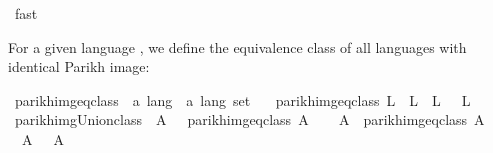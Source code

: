 \begin{isabellebody}
\ fast\isanewline
{}\isamarkupfalse%
%
\endisatagproof
{\isafoldproof}%
%
\isadelimproof
%
\endisadelimproof
%
\isadelimdocument
%
\endisadelimdocument
%
\isatagdocument
%
\isamarkuptrue%
%
\endisatagdocument
{\isafolddocument}%
%
\isadelimdocument
%
\endisadelimdocument
%
\begin{isamarkuptext}%
For a given language , we define the equivalence class of all languages with identical Parikh
image:%
\end{isamarkuptext}\isamarkuptrue%
\isamarkupfalse%
\ parikh{\isacharunderscore}{\kern0pt}img{\isacharunderscore}{\kern0pt}eq{\isacharunderscore}{\kern0pt}class\ {\isacharcolon}{\kern0pt}{\isacharcolon}{\kern0pt}\ {\isachardoublequoteopen}{\isacharprime}{\kern0pt}a\ lang\ {\isasymRightarrow}\ {\isacharprime}{\kern0pt}a\ lang\ set{\isachardoublequoteclose}\ \isanewline
\ \ {\isachardoublequoteopen}parikh{\isacharunderscore}{\kern0pt}img{\isacharunderscore}{\kern0pt}eq{\isacharunderscore}{\kern0pt}class\ L\ {\isasymequiv}\ {\isacharbraceleft}{\kern0pt}L{\isacharprime}{\kern0pt}{\isachardot}{\kern0pt}\ {\isasymPsi}\ L{\isacharprime}{\kern0pt}\ {\isacharequal}{\kern0pt}\ {\isasymPsi}\ L{\isacharbraceright}{\kern0pt}{\isachardoublequoteclose}\isanewline
\isanewline
{}\isamarkupfalse%
\ parikh{\isacharunderscore}{\kern0pt}img{\isacharunderscore}{\kern0pt}Union{\isacharunderscore}{\kern0pt}class{\isacharcolon}{\kern0pt}\ {\isachardoublequoteopen}{\isasymPsi}\ A\ {\isacharequal}{\kern0pt}\ {\isasymPsi}\ {\isacharparenleft}{\kern0pt}{\isasymUnion}{\isacharparenleft}{\kern0pt}parikh{\isacharunderscore}{\kern0pt}img{\isacharunderscore}{\kern0pt}eq{\isacharunderscore}{\kern0pt}class\ A{\isacharparenright}{\kern0pt}{\isacharparenright}{\kern0pt}{\isachardoublequoteclose}\isanewline
%
\isadelimproof
%
\endisadelimproof
%
\isatagproof
{}\isamarkupfalse%
\isanewline
\ \ \isamarkupfalse%
\ {\isacharquery}{\kern0pt}A{\isacharprime}{\kern0pt}\ {\isacharequal}{\kern0pt}\ {\isachardoublequoteopen}{\isasymUnion}{\isacharparenleft}{\kern0pt}parikh{\isacharunderscore}{\kern0pt}img{\isacharunderscore}{\kern0pt}eq{\isacharunderscore}{\kern0pt}class\ A{\isacharparenright}{\kern0pt}{\isachardoublequoteclose}\isanewline
\ \ \isamarkupfalse%
\ {\isachardoublequoteopen}{\isasymPsi}\ A\ {\isasymsubseteq}\ {\isasymPsi}\ {\isacharquery}{\kern0pt}A{\isacharprime}{\kern0pt}{\isachardoublequoteclose}\isanewline

\end{isabellebody}
